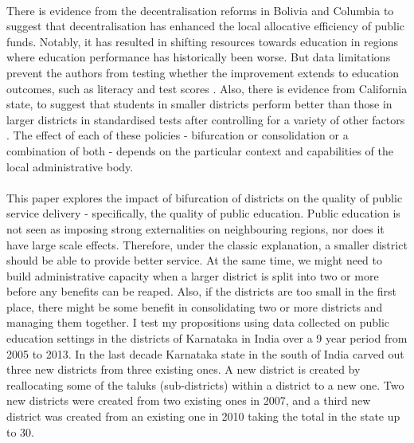 \documentclass[12pt, a4paper]{article}
\begin{document}
\paragraph{} There is evidence from the decentralisation reforms in Bolivia and Columbia to suggest that decentralisation has enhanced the local allocative efficiency of public funds. Notably, it has resulted in shifting resources towards education in regions where education performance has historically been worse. But data limitations prevent the authors from testing whether the improvement extends to education outcomes, such as literacy and test scores \parencite{faguet2008decentralization}. Also, there is evidence from California state, to suggest that students in smaller districts perform better than those in larger districts in standardised tests after controlling for a variety of other factors \parencite{driscoll2003school}. The effect of each of these policies - bifurcation or consolidation or a combination of both - depends on the particular context and capabilities of the local administrative body. 

\paragraph{}This paper explores the impact of bifurcation of districts on the quality of public service delivery - specifically, the quality of public education. Public education is not seen as imposing strong externalities on neighbouring regions, nor does it have large scale effects. Therefore, under the classic explanation, a smaller district should be able to provide better service. At the same time, we might need to build administrative capacity when a larger district is split into two or more before any benefits can be reaped. Also, if the districts are too small in the first place, there might be some benefit in consolidating two or more districts and managing them together. I test my propositions using data collected on public education settings in the districts of Karnataka in India over a 9 year period from 2005 to 2013. In the last decade Karnataka state in the south of India carved out three new districts from three existing ones. A new district is created by reallocating some of the taluks (sub-districts) within a district to a new one. Two new districts were created from two existing ones in 2007, and a third new district was created from an existing one in 2010 taking the total in the state up to 30. 
\end{document}
